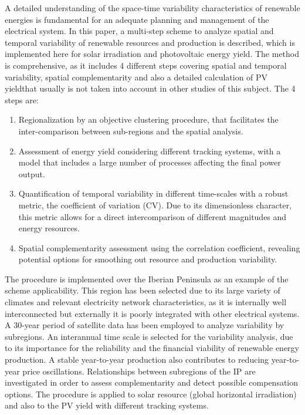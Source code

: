 A detailed understanding of the space-time variability characteristics of renewable energies is fundamental for an adequate planning and management of the electrical system. In this paper, a multi-step scheme to analyze spatial and temporal variability of renewable resources and production is described, which is implemented here for solar irradiation and photovoltaic energy yield. The method is comprehensive, as it includes 4 different steps covering spatial and temporal variability, spatial complementarity and also a detailed calculation of PV yieldthat usually is not taken into account in other studies of this subject. The 4 steps are:
\begin{enumerate}
\item Regionalization by an objective clustering procedure, that facilitates the inter-comparison between sub-regions and the spatial analysis. 
\item Assessment of energy yield considering different tracking systems, with a model that includes a large number of processes affecting the final power output.
\item Quantification of temporal variability in different time-scales with a robust metric, the coefficient of variation (CV). Due to its dimensionless character, this metric allows for a direct intercomparison of different magnitudes and energy resources.
\item Spatial complementarity assessment using the correlation coefficient, revealing potential options for smoothing out resource and production variability.
\end{enumerate}

The procedure is implemented over the Iberian Peninsula as an example of the scheme applicability. This region has been selected due to its large variety of climates and relevant electricity network characteristics, as it is internally well interconnected but externally it is poorly integrated with other electrical systems. A 30-year period of satellite data has been employed to analyze variability by subregions. An interannual time scale is selected for the variability analysis, due to its importance for the reliability and the financial viability of renewable energy production. A stable year-to-year production also contributes to reducing year-to-year price oscillations. Relationships between subregions of the IP are investigated in order to assess complementarity and detect possible compensation options. The procedure is applied to solar resource (global horizontal irradiation) and also to the PV yield with different tracking systems.

